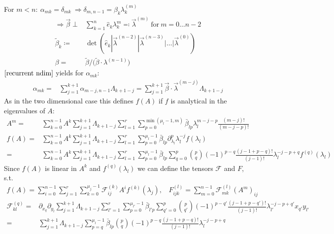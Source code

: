 \documentclass[12pt]{article}
\newcommand{\del}{\partial}
\begin{document}
For $m<n:\ \alpha_{mk} = \delta_{mk}\ \Rightarrow \delta_{m,n-1} = \beta_k \lambda_k^{(m)}$
\begin{align}
\Rightarrow \vec \beta \perp& \sum_{k=1}^n \hat e_k \lambda_k^m \eqqcolon \vec \lambda^{(m)} \ \text{for}\ m=0\dots n-2 \nonumber\\
\tilde\beta_k \coloneqq& \det(\hat e_k | \vec\lambda^{(n-2)} | \vec\lambda^{(n-3)} | \dots | \vec\lambda^{(0)})\nonumber\\
\beta =& \tilde\beta /\big( \tilde \beta \cdot \lambda^{(n-1)} \big)
\end{align}
$\eqref{recurrent ndim}$ yields for $\alpha_{mk}$:
\begin{align}
\alpha_{mk} =& \sum_{j=1}^{k+1} \alpha_{m-j,n-1} \Lambda_{k+1-j} = \sum_{j=1}^{k+1} \vec\beta\cdot\vec\lambda^{(m-j)} \Lambda_{k+1-j}
\end{align}
As in the two dimensional case this defines $f(A)$ if $f$ is analytical in the eigenvalues of $A$:
\begin{align}
A^m =& \sum_{k=0}^{n-1} A^k \sum_{j=1}^{k+1} \Lambda_{k+1-j} \sum_{l=1}^r \sum_{p=0}^{\min(\mu_l-1,m)} \bar\beta_{lp} \lambda_l^{m-j-p} \frac{(m-j)!}{(m-j-p)!}\\
f(A) =& \sum_{k=0}^{n-1} A^k \sum_{j=1}^{k+1} \Lambda_{k+1-j} \sum_{l=1}^r \sum_{p=0}^{\mu_l-1} \bar\beta_{lp} \del_{\lambda_l}^p \lambda_l^{-j} f(\lambda_l) \nonumber\\
=& \sum_{k=0}^{n-1} A^k \sum_{j=1}^{k+1} \Lambda_{k+1-j} \sum_{l=1}^r \sum_{p=0}^{\mu_l-1} \bar\beta_{lp} \sum_{q=0}^p \binom pq (-1)^{p-q}\frac{(j-1+p-q)!}{(j-1)!} \lambda_l^{-j-p+q} f^{(q)}(\lambda_l)
\end{align}
Since $f(A)$ is linear in $A^k$ and $f^{(q)}(\lambda_l)$ we can define the tensors $\mathcal F$ and $F$, s.t.
\begin{align}
f(A) = \sum_{i=0}^{n-1} \sum_{j=1}^r \sum_{k=0}^{\mu_j-1} \mathcal F_{ij}^{(k)} A^i f^{(k)}(\lambda_j),\ \ \ \ F_{ijk}^{(l)} = \sum_{m=0}^{n-1} \mathcal F_{mk}^{(l)} (A^m)_{ij}
\end{align}
\begin{align}
\mathcal F_{kl}^{(q)} =& \del_{x_q} \del_{y_l} \sum_{j=1}^{k+1} \Lambda_{k+1-j} \sum_{l'=1}^r \sum_{p=0}^{\mu_{l'}-1} \bar\beta_{l'p} \sum_{q'=0}^p \binom p{q'} (-1)^{p-q'}\frac{(j-1+p-q')!}{(j-1)!} \lambda_{l'}^{-j-p+q'} x_{q'} y_{l'} \nonumber\\
=& \sum_{j=1}^{k+1} \Lambda_{k+1-j} \sum_{p=q}^{\mu_l-1} \bar\beta_{lp} \binom pq (-1)^{p-q}\frac{(j-1+p-q)!}{(j-1)!} \lambda_l^{-j-p+q}
\end{align}
\end{document}
